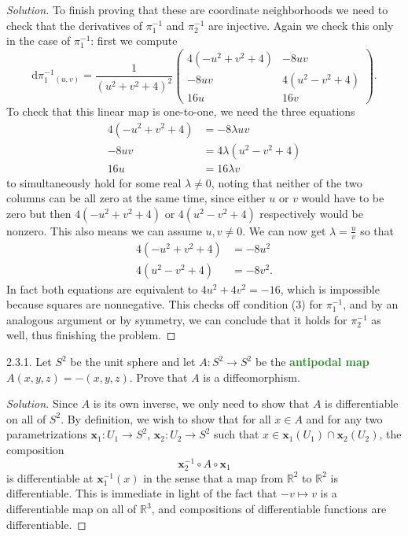 \documentclass[10pt]{scrartcl}
\providecommand{\RR}{\mathbb R}
\providecommand{\inv}{^{-1}}
\providecommand{\mb}[1]{\mathbf{#1}}
\newenvironment{soln}{\begin{proof}[Solution]}{\end{proof}}
\providecommand{\vocab}[1]{{\textbf{\textcolor{ForestGreen}{#1}}}}
\begin{document}
\begin{soln}
	To finish proving that these are coordinate neighborhoods we need to check
	that the derivatives of $\pi_1\inv$ and $\pi_2\inv$ are injective.
	Again we check this only in the case of $\pi_1\inv$: first we compute
	\[\mathrm d\pi_1\inv_{(u,v)} =
	\frac1{(u^2+v^2+4)^2}
	\begin{pmatrix}
		4(-u^2+v^2+4) & -8uv\\
		-8uv & 4(u^2-v^2+4)\\
		16u & 16v
	\end{pmatrix}.\]
	To check that this linear map is one-to-one,
	we need the three equations
	\begin{align*}
		4(-u^2 + v^2 + 4) &= -8\lambda uv\\
		-8uv &= 4\lambda(u^2 - v^2 + 4)\\
		16u &= 16\lambda v
	\end{align*}
	to simultaneously hold for some real $\lambda \ne 0$,
	noting that neither of the two columns can be all zero at the same time,
	since either $u$ or $v$ would have to be zero
	but then $4(-u^2+v^2+4)$ or $4(u^2-v^2+4)$ respectively would be nonzero.
	This also means we can assume $u,v\ne0$.
	We can now get $\lambda = \frac uv$ so that
	\begin{align*}
		4(-u^2 + v^2 + 4) &= -8u^2\\
		4(u^2 - v^2 + 4) &= -8v^2.
	\end{align*}
	In fact both equations are equivalent to $4u^2 + 4v^2 = -16$,
	which is impossible because squares are nonnegative.
	This checks off condition (3) for $\pi_1\inv$,
	and by an analogous argument or by symmetry, we can conclude
	that it holds for $\pi_2\inv$ as well, thus finishing the problem.
\end{soln}
\pagebreak
\begin{problem*}2.3.1.
	Let $S^2$ be the unit sphere and let
	$A\colon S^2\to S^2$ be the \vocab{antipodal map}
	$A(x,y,z) = -(x,y,z)$. Prove that $A$ is a diffeomorphism.
\end{problem*}

\begin{soln}
	Since $A$ is its own inverse, we only need to show that
	$A$ is differentiable on all of $S^2$.
	By definition, we wish to show that for all $x\in A$
	and for any two parametrizations
	$\mb x_1\colon U_1\to S^2$, $\mb x_2\colon U_2\to S^2$
	such that $x\in\mb x_1(U_1)\cap\mb x_2(U_2)$,
	the composition
	\[\mb x_2\inv\circ A\circ\mb x_1\]
	is differentiable at $\mb x_1\inv(x)$ in the sense that
	a map from $\RR^2$ to $\RR^2$ is differentiable. This is immediate
	in light of the fact that $-v\mapsto v$ is a differentiable map
	on all of $\RR^3$, and compositions of differentiable functions
	are differentiable.
\end{soln}
\end{document}
